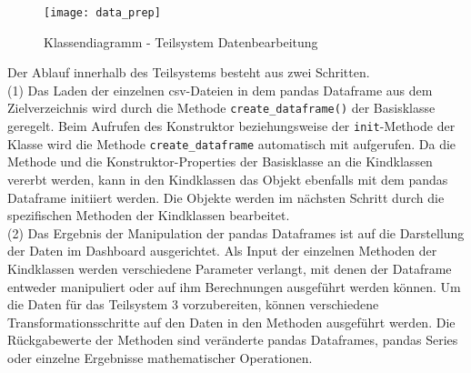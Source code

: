     \begin{figure}[H]
        \centering
            \texttt{[image: data\_prep]}
            \caption{Klassendiagramm - Teilsystem Datenbearbeitung}
            \label{fig:classes data_prep}
    \end{figure}

    Der Ablauf innerhalb des Teilsystems besteht aus zwei Schritten.\\
    (1) Das Laden der einzelnen csv-Dateien in dem pandas Dataframe aus dem Zielverzeichnis wird durch die Methode \texttt{create\_dataframe()} der Basisklasse geregelt.
    Beim Aufrufen des Konstruktor beziehungsweise der \texttt{init}-Methode der Klasse wird die Methode \texttt{create\_dataframe} 
    automatisch mit aufgerufen. Da die Methode und die Konstruktor-Properties der Basisklasse an die Kindklassen vererbt werden, kann in den Kindklassen das Objekt ebenfalls mit dem 
    pandas Dataframe initiiert werden. Die Objekte werden im nächsten Schritt durch die spezifischen Methoden der Kindklassen bearbeitet.\\
    (2) Das Ergebnis der Manipulation der pandas Dataframes ist auf die Darstellung der Daten im Dashboard ausgerichtet. Als Input der einzelnen Methoden der
    Kindklassen werden verschiedene Parameter verlangt, mit denen der Dataframe entweder manipuliert oder auf ihm Berechnungen ausgeführt werden können. 
    Um die Daten für das Teilsystem 3 vorzubereiten, können verschiedene Transformationsschritte auf den Daten in den Methoden ausgeführt werden. 
    Die Rückgabewerte der Methoden sind veränderte pandas Dataframes, pandas Series oder einzelne Ergebnisse mathematischer Operationen.
    
    

        

